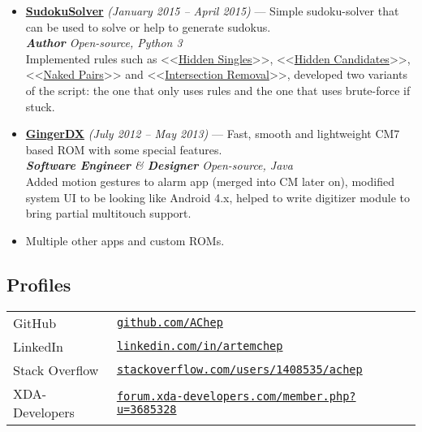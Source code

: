 \documentclass[a4paper]{article}
\begin{document}
\begin{itemize}
		\item \href{https://github.com/AChep/SudokuSolver}{\textbf{SudokuSolver}} \textit{(January 2015 -- April 2015)} --- Simple sudoku-solver that can be used to solve or help to generate sudokus. \\[0.2em]
		{\footnotesize \textit{\textbf{Author} \hfill Open-source, Python 3}} \\[0.2em]
		Implemented rules such as <<\href{http://www.sudokuwiki.org/Getting_Started}{Hidden Singles}>>, <<\href{http://www.sudokuwiki.org/Hidden_Candidates}{Hidden Candidates}>>, <<\href{http://www.sudokuwiki.org/Naked_Candidates#NP}{Naked Pairs}>> and <<\href{http://www.sudokuwiki.org/intersection_removal}{Intersection Removal}>>, developed two variants of the script: the one that only uses rules and the one that uses brute-force if stuck.
		
		\item \href{https://forum.xda-developers.com/showthread.php?t=1188486}{\textbf{GingerDX}} \textit{(July 2012 -- May 2013)} --- Fast, smooth and lightweight CM7 based ROM with some special features. \\[0.2em]
		{\footnotesize \textit{\textbf{Software Engineer} \& \textbf{Designer} \hfill Open-source, Java}} \\[0.2em] 
		Added motion gestures to alarm app (merged into CM later on), modified system UI to be looking like Android 4.x, helped to write digitizer module to bring partial multitouch support.  

		\item Multiple other apps and custom ROMs.
	\end{itemize}
	\subsection*{Profiles}
	\begin{tabular}{@{}ll}
		GitHub & \href{https://github.com/AChep}{\texttt{github.com/AChep}} \\
		LinkedIn & \href{https://www.linkedin.com/in/artemchep/}{\texttt{linkedin.com/in/artemchep}} \\
		Stack Overflow & \href{https://stackoverflow.com/users/1408535/achep}{\texttt{stackoverflow.com/users/1408535/achep}} \\
		XDA-Developers & \href{https://forum.xda-developers.com/member.php?u=3685328}{\texttt{forum.xda-developers.com/member.php?u=3685328}} \\
	\end{tabular}
\end{document}
